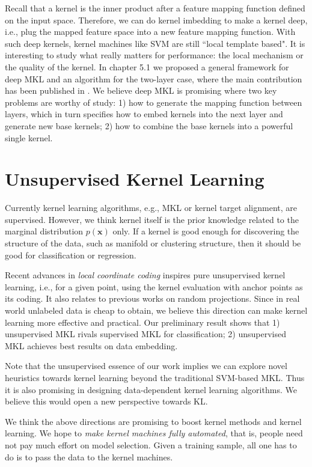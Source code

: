 Recall that a kernel is the inner product after a feature mapping function defined on the input space. Therefore, we can do kernel imbedding to make a kernel deep, i.e., plug the mapped feature space into a new feature mapping function. With such deep kernels,  kernel machines like SVM are still ``local template based". It is interesting to study what really matters for performance: the local mechanism or the quality of the kernel. In chapter 5.1 we proposed a general framework for deep MKL and an algorithm for the two-layer case, where the main contribution has been published in \cite{aistats/ZhuangTH11}. We believe deep MKL is promising where two key problems are worthy of study: 1) how to generate the mapping function between layers, which in turn specifies how to embed kernels into the next layer and generate new base kernels; 2) how to combine the base kernels into a powerful single kernel.

\section{Unsupervised Kernel Learning}

Currently kernel learning algorithms, e.g., MKL or kernel target alignment, are supervised. However, we think kernel itself is the prior knowledge related to the marginal distribution $p(\mathbf x)$ only. If a kernel is good enough for discovering the structure of the data, such as manifold or clustering structure, then it should be good for classification or regression.

Recent advances in {\em local coordinate coding} inspires pure unsupervised kernel learning\cite{nips/YuZG09,icml/YuZ10,cvpr/WangYYLHG10}, i.e., for a given point, using the kernel evaluation with anchor points as its coding. It also relates to previous works on random projections\cite{ml/BalcanBV06}. Since in real world unlabeled data is cheap to obtain, we believe this direction can make kernel learning more effective and practical. Our preliminary result shows that 1) unsupervised MKL rivals supervised MKL for classification; 2) unsupervised MKL achieves best results on data embedding.

Note that the unsupervised essence of our work implies we can explore novel heuristics towards kernel learning beyond the traditional SVM-based MKL. Thus it is also promising in designing data-dependent kernel learning algorithms. We believe this would open a new perspective towards KL.

We think the above directions are promising to boost kernel methods and kernel learning. We hope to {\em make kernel machines fully automated}, that is, people need not pay much effort on model selection. Given a training sample, all one has to do is to pass the data to the kernel machines.


